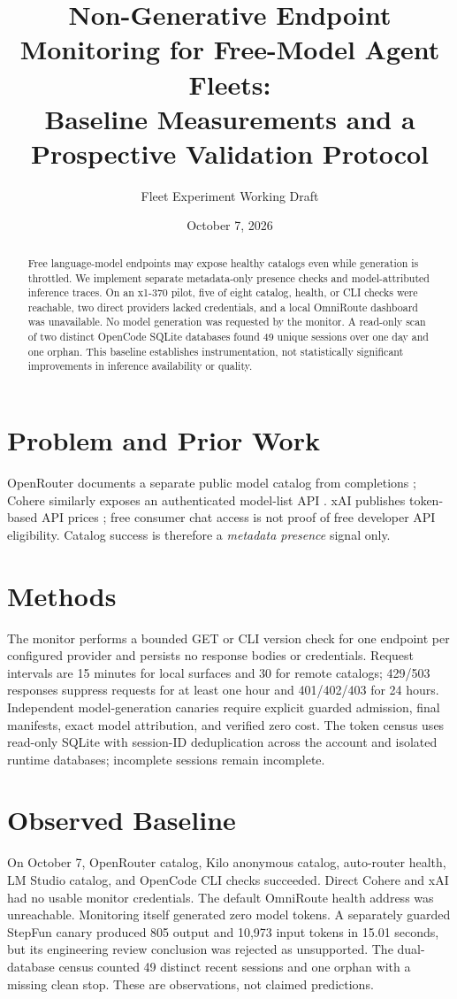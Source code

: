 \documentclass[11pt]{article}
\title{Non-Generative Endpoint Monitoring for Free-Model Agent Fleets:\\
Baseline Measurements and a Prospective Validation Protocol}
\author{Fleet Experiment Working Draft}
\date{October 7, 2026}
\begin{document}
\maketitle
\begin{abstract}
Free language-model endpoints may expose healthy catalogs even while
generation is throttled. We implement separate metadata-only presence checks
and model-attributed inference traces. On an x1-370 pilot, five of eight
catalog, health, or CLI checks were reachable, two direct providers lacked
credentials, and a local OmniRoute dashboard was unavailable. No model
generation was requested by the monitor. A read-only scan of two distinct
OpenCode SQLite databases found 49 unique sessions over one day and one orphan.
This baseline establishes instrumentation, not statistically significant
improvements in inference availability or quality.
\end{abstract}
\section{Problem and Prior Work}
OpenRouter documents a separate public model catalog from completions
\cite{openrouter}; Cohere similarly exposes an authenticated model-list API
\cite{cohere}. xAI publishes token-based API prices \cite{xai}; free consumer
chat access is not proof of free developer API eligibility.
Catalog success is therefore a \emph{metadata presence} signal only.
\section{Methods}
The monitor performs a bounded GET or CLI version check for one endpoint per
configured provider and persists no response bodies or credentials. Request
intervals are 15 minutes for local surfaces and 30 for remote catalogs;
429/503 responses suppress requests for at least one hour and 401/402/403 for
24 hours. Independent model-generation canaries require explicit guarded
admission, final manifests, exact model attribution, and verified zero cost.
The token census uses read-only SQLite with session-ID deduplication across
the account and isolated runtime databases; incomplete sessions remain
incomplete.

\section{Observed Baseline}
On October 7, OpenRouter catalog, Kilo anonymous catalog, auto-router health,
LM Studio catalog, and OpenCode CLI checks succeeded. Direct Cohere and xAI
had no usable monitor credentials. The default OmniRoute health address was
unreachable. Monitoring itself generated zero model tokens. A separately
guarded StepFun canary produced 805 output and 10,973 input tokens in 15.01
seconds, but its engineering review conclusion was rejected as unsupported.
The dual-database census counted 49 distinct recent sessions and one orphan
with a missing clean stop. These are observations, not claimed predictions.
\end{document}
